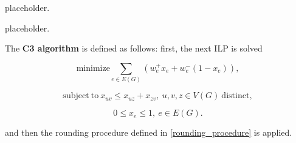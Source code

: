 placeholder. 

placeholder. 

%

\begin{definition}[C3] \label{c3_final}
    The \textbf{C3 algorithm} is defined as follows: first, the next ILP is solved

    \begin{equation}
        \mathrm{minimize} \sum_{e \in E(G)} (w_e^+x_e + w_e^-(1 - x_e)),
    \end{equation}

    \begin{equation}
        \mathrm{subject \ to \ } x_{uv} \le x_{uz} + x_{zv}, \ u, v, z \in V(G) \mathrm{\ distinct},
    \end{equation}

    \begin{equation}
        0 \le x_e \le 1, \ e \in E(G).
    \end{equation}

    and then the rounding procedure defined in \cref{rounding_procedure} is applied.

\end{definition}

\cleardoublepage

